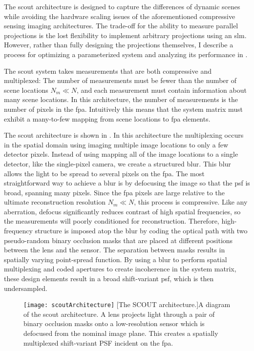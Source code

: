 The \gls{scout} architecture is designed to capture the differences of dynamic scenes while avoiding the hardware scaling issues of the aforementioned \gls{compressive sensing} imaging architectures. The trade-off for the ability to measure parallel projections is the lost flexibility to implement arbitrary projections using an \gls{slm}. However, rather than fully designing the projections themselves, I describe a process for optimizing a parameterized system and analyzing its performance in .

The \gls{scout} system takes measurements that are both compressive and multiplexed: The number of measurements must be fewer than the number of scene locations $N_m \ll N$, and each measurement must contain information about many scene locations. In this architecture, the number of measurements is the number of pixels in the \gls{fpa}. Intuitively this means that the system matrix must exhibit a many-to-few mapping from scene locations to \gls{fpa} elements. 

The \gls{scout} architecture is shown in . In this architecture the \gls{multiplexing} occurs in the spatial domain using imaging multiple image locations to only a few detector pixels. Instead of using mapping all of the image locations to a single detector, like the single-pixel camera, we create a structured blur. This blur allows the light to be spread to several pixels on the \gls{fpa}. The most straightforward way to achieve a blur is by defocusing the image so that the \gls{psf} is broad, spanning many pixels. Since the \gls{fpa} pixels are large relative to the ultimate reconstruction resolution $N_m \ll N$, this process is compressive. Like any aberration, defocus significantly reduces contrast of high spatial frequencies, so the measurements will poorly conditioned for reconstruction. Therefore, high-frequency structure is imposed atop the blur by coding the optical path with two pseudo-random binary occlusion masks that are placed at different positions between the lens and the sensor. The separation between masks results in spatially varying point-spread function. By using a blur to perform spatial multiplexing and coded apertures to create incoherence in the system matrix, these design elements result in a broad shift-variant \gls{psf}, which is then undersampled.


\begin{figure}
	\texttt{[image: scoutArchitecture]}
	[The SCOUT architecture.]{A diagram of the \gls{scout} architecture. A lens projects light through a pair of binary occlusion masks onto a low-resolution sensor which is defocused from the nominal image plane. This creates a spatially multiplexed shift-variant PSF incident on the \gls{fpa}.  }
	\label{fig:scoutArchitecture}
\end{figure}



